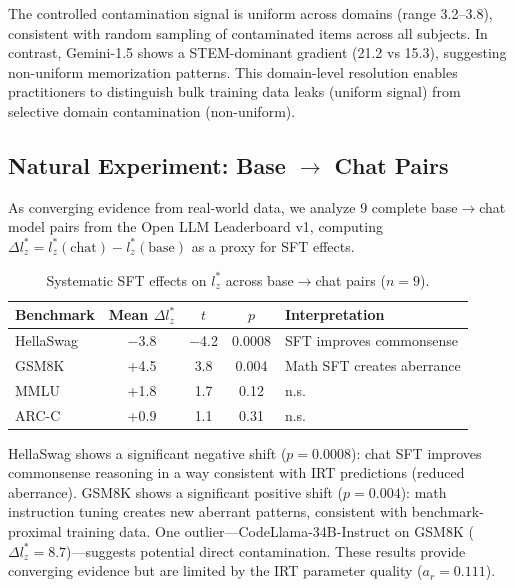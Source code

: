 \documentclass[11pt,a4paper]{article}
\newcommand{\lzstar}{$l_{z}^{*}$}
\begin{document}
The controlled contamination signal is uniform across domains (range 3.2--3.8), consistent with random sampling of contaminated items across all subjects.
In contrast, Gemini-1.5 shows a STEM-dominant gradient (21.2 vs 15.3), suggesting non-uniform memorization patterns.
This domain-level resolution enables practitioners to distinguish bulk training data leaks (uniform signal) from selective domain contamination (non-uniform).

\subsection{Natural Experiment: Base $\to$ Chat Pairs}
\label{sec:natural}

As converging evidence from real-world data, we analyze 9 complete base$\to$chat model pairs from the Open LLM Leaderboard v1, computing $\Delta l_z^* = l_z^*(\text{chat}) - l_z^*(\text{base})$ as a proxy for SFT effects.

\begin{table}[h]
\centering
\small
\caption{Systematic SFT effects on \lzstar{} across base$\to$chat pairs ($n=9$).}
\label{tab:natural}
\begin{tabular}{lcccl}
\toprule
\textbf{Benchmark} & \textbf{Mean $\Delta l_z^*$} & $t$ & $p$ & \textbf{Interpretation} \\
\midrule
HellaSwag & $-$3.8 & $-$4.2 & 0.0008 & SFT improves commonsense \\
GSM8K & +4.5 & 3.8 & 0.004 & Math SFT creates aberrance \\
MMLU & +1.8 & 1.7 & 0.12 & n.s. \\
ARC-C & +0.9 & 1.1 & 0.31 & n.s. \\
\bottomrule
\end{tabular}
\end{table}

HellaSwag shows a significant negative shift ($p = 0.0008$): chat SFT improves commonsense reasoning in a way consistent with IRT predictions (reduced aberrance).
GSM8K shows a significant positive shift ($p = 0.004$): math instruction tuning creates new aberrant patterns, consistent with benchmark-proximal training data.
One outlier---CodeLlama-34B-Instruct on GSM8K ($\Delta l_z^* = 8.7$)---suggests potential direct contamination.
These results provide converging evidence but are limited by the IRT parameter quality ($a_r = 0.111$).

\end{document}
